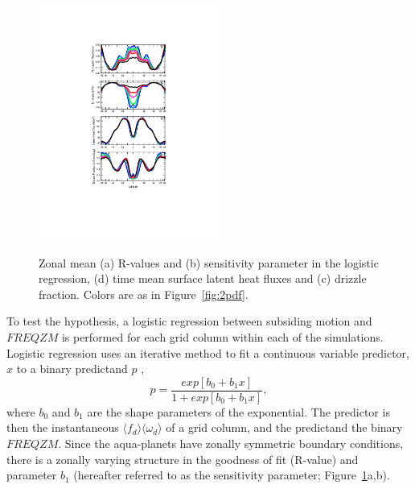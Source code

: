 \documentclass[times]{qjrms4}
\begin{document}
\begin{figure}[t]
\begin{center}
\noindent\includegraphics[width=14pc,angle=0]{figs/temp_4zonal.pdf}\\
\end{center}
\caption{Zonal mean (a) R-values and (b) sensitivity parameter in the logistic regression, (d) time mean surface latent heat fluxes and (c) drizzle fraction. Colors are as in Figure~\ref{fig:2pdf}.}
\label{fig:4zonal}
\end{figure}

To test the hypothesis, a logistic regression between subsiding motion and $FREQZM$ is performed for each grid column within each of the simulations. Logistic regression uses an iterative method to fit a continuous variable predictor, $x$ to a binary predictand $p$ \citep{WILKSBOOK},
\begin{equation}
p = \frac{exp{[b_0 + b_1 x]}}{1 + exp{[b_0 + b_1 x]}}, \label{eq:eq6-3}
\end{equation}
where $b_0$ and $b_1$ are the shape parameters of the exponential. The predictor is then the instantaneous $\langle f_{d} \rangle \langle \omega_{d} \rangle$ of a grid column, and the predictand the binary $FREQZM$. Since the aqua-planets have zonally symmetric boundary conditions, there is a zonally varying structure in the goodness of fit (R-value) and parameter $b_1$ (hereafter referred to as the sensitivity parameter; Figure~\ref{fig:4zonal}a,b).
\end{document}
